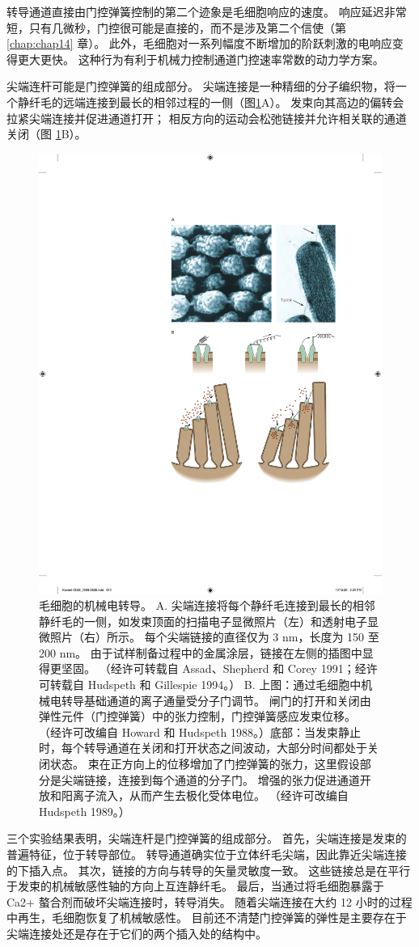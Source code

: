 转导通道直接由门控弹簧控制的第二个迹象是毛细胞响应的速度。 
响应延迟非常短，只有几微秒，门控很可能是直接的，而不是涉及第二个信使（第 \ref{chap:chap14} 章）。
此外，毛细胞对一系列幅度不断增加的阶跃刺激的电响应变得更大更快。 
这种行为有利于机械力控制通道门控速率常数的动力学方案。


尖端连杆可能是门控弹簧的组成部分。 
尖端连接是一种精细的分子编织物，将一个静纤毛的远端连接到最长的相邻过程的一侧（图\ref{fig:26_8}A）。 
发束向其高边的偏转会拉紧尖端连接并促进通道打开； 相反方向的运动会松弛链接并允许相关联的通道关闭（图 \ref{fig:26_8}B）。


\begin{figure}[htbp]
	\centering
	\includegraphics[width=0.5\linewidth]{chap26/fig_26_8}
	\caption{毛细胞的机械电转导。 
		A. 尖端连接将每个静纤毛连接到最长的相邻静纤毛的一侧，如发束顶面的扫描电子显微照片（左）和透射电子显微照片（右）所示。 
		每个尖端链接的直径仅为 3 nm，长度为 150 至 200 nm。 
		由于试样制备过程中的金属涂层，链接在左侧的插图中显得更坚固。 
		（经许可转载自 Assad、Shepherd 和 Corey 1991；经许可转载自 Hudspeth 和 Gillespie 1994。） 
		B. 上图：通过毛细胞中机械电转导基础通道的离子通量受分子门调节。 
		闸门的打开和关闭由弹性元件（门控弹簧）中的张力控制，门控弹簧感应发束位移。 （经许可改编自 Howard 和 Hudspeth 1988。）底部：当发束静止时，每个转导通道在关闭和打开状态之间波动，大部分时间都处于关闭状态。 
		束在正方向上的位移增加了门控弹簧的张力，这里假设部分是尖端链接，连接到每个通道的分子门。 
		增强的张力促进通道开放和阳离子流入，从而产生去极化受体电位。
		 （经许可改编自 Hudspeth 1989。）}
	\label{fig:26_8}
\end{figure}


三个实验结果表明，尖端连杆是门控弹簧的组成部分。 
首先，尖端连接是发束的普遍特征，位于转导部位。 
转导通道确实位于立体纤毛尖端，因此靠近尖端连接的下插入点。 
其次，链接的方向与转导的矢量灵敏度一致。 
这些链接总是在平行于发束的机械敏感性轴的方向上互连静纤毛。 
最后，当通过将毛细胞暴露于 Ca2+ 螯合剂而破坏尖端连接时，转导消失。 
随着尖端连接在大约 12 小时的过程中再生，毛细胞恢复了机械敏感性。 
目前还不清楚门控弹簧的弹性是主要存在于尖端连接处还是存在于它们的两个插入处的结构中。


